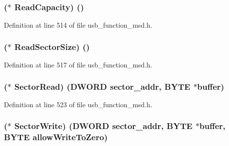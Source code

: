 \subsubsection[{Read\+Capacity}]{($\ast$ Read\+Capacity) ()}\label{struct_l_u_n___f_u_n_c_t_i_o_n_s_a4020fcd582133cca4bfee4602d7d3d30}


Definition at line 514 of file usb\+\_\+function\+\_\+msd.\+h.

\hypertarget{struct_l_u_n___f_u_n_c_t_i_o_n_s_a7573531b62de308a74ab742eaf739741}{}
\subsubsection[{Read\+Sector\+Size}]{($\ast$ Read\+Sector\+Size) ()}\label{struct_l_u_n___f_u_n_c_t_i_o_n_s_a7573531b62de308a74ab742eaf739741}


Definition at line 517 of file usb\+\_\+function\+\_\+msd.\+h.

\hypertarget{struct_l_u_n___f_u_n_c_t_i_o_n_s_ae6ada99255fb6b473d160c9f5d0f529b}{}
\subsubsection[{Sector\+Read}]{($\ast$ Sector\+Read) ({\bf D\+W\+O\+R\+D} sector\+\_\+addr, {\bf B\+Y\+T\+E} $\ast$buffer)}\label{struct_l_u_n___f_u_n_c_t_i_o_n_s_ae6ada99255fb6b473d160c9f5d0f529b}


Definition at line 523 of file usb\+\_\+function\+\_\+msd.\+h.

\hypertarget{struct_l_u_n___f_u_n_c_t_i_o_n_s_a4c7cbb16a7c5d93707b0f47121fca6eb}{}
\subsubsection[{Sector\+Write}]{($\ast$ Sector\+Write) ({\bf D\+W\+O\+R\+D} sector\+\_\+addr, {\bf B\+Y\+T\+E} $\ast$buffer, {\bf B\+Y\+T\+E} allow\+Write\+To\+Zero)}\label{struct_l_u_n___f_u_n_c_t_i_o_n_s_a4c7cbb16a7c5d93707b0f47121fca6eb}


